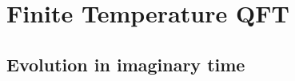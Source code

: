 \documentclass[../QFT_main.tex]{subfiles}
\begin{document}
\chapter{Finite Temperature QFT}\label{ch:finite_temperature_QFT}


\section{Evolution in imaginary time}
\end{document}
